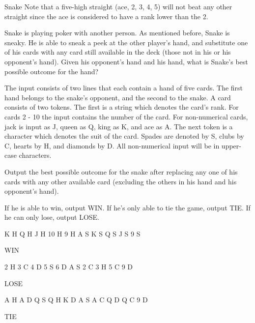 \begin{problem}{Snake}
 Note that a five-high straight (ace, 2, 3, 4, 5) will not beat any other straight since the ace is considered to have a rank lower than the 2.
 
 Snake is playing poker with another person. As mentioned before, Snake is sneaky. He is able to sneak a peek at the other player's hand, and substitute one of his cards with any card still available in the deck (those not in his or his opponent's hand). Given his opponent's hand and his hand, what is Snake's best possible outcome for the hand?

\end{problem}

\begin{formalin}
The input consists of two lines that each contain a hand of five cards. 
The first hand belongs to the snake's opponent, and the second to the snake.
A card consists of two tokens. The first is a string which denotes the card's rank. 
For cards 2 - 10 the input contains the number of the card. For non-numerical cards, 
jack is input as J, queen as Q, king as K, and ace as A. The next token is a character 
which denotes the suit of the card. Spades are denoted by S, clubs by C, hearts by H, 
and diamonds by D. All non-numerical input will be in upper-case characters.
\end{formalin}

\begin{formalout}
Output the best possible outcome for the snake after replacing any one of his cards with 
any other available card (excluding the others in his hand and his opponent's hand). 

If he is able to win, output WIN. If he's only able to tie the game, output TIE. 
If he can only lose, output LOSE.
\end{formalout}

\begin{datain}
K H Q H J H 10 H 9 H
A S K S Q S J S 9 S
\end{datain}
\begin{dataout}
WIN
\end{dataout}

\begin{datain}
2 H 3 C 4 D 5 S 6 D
A S 2 C 3 H 5 C 9 D
\end{datain}
\begin{dataout}
LOSE
\end{dataout}

\begin{datain}
A H A D Q S Q H K D
A S A C Q D Q C 9 D
\end{datain}
\begin{dataout}
TIE
\end{dataout}